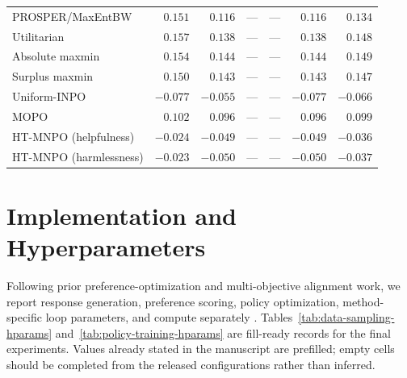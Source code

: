\documentclass{article}
\theoremstyle{remark}
\theoremstyle{plain}
\begin{document}
\begin{table}[t]
\begin{tabular}{lrrrrrr}
PROSPER/MaxEntBW & $0.151$ & $0.116$ & --- & --- & $0.116$ & $0.134$\\
Utilitarian & $0.157$ & $0.138$ & --- & --- & $0.138$ & $0.148$\\
Absolute maxmin & $0.154$ & $0.144$ & --- & --- & $0.144$ & $0.149$\\
Surplus maxmin & $0.150$ & $0.143$ & --- & --- & $0.143$ & $0.147$\\
Uniform-INPO & $-0.077$ & $-0.055$ & --- & --- & $-0.077$ & $-0.066$\\
MOPO & $0.102$ & $0.096$ & --- & --- & $0.096$ & $0.099$\\
HT-MNPO (helpfulness) & $-0.024$ & $-0.049$ & --- & --- & $-0.049$ & $-0.036$\\
HT-MNPO (harmlessness) & $-0.023$ & $-0.050$ & --- & --- & $-0.050$ & $-0.037$\\
\bottomrule
\end{tabular}
\end{table}

\section{Implementation and Hyperparameters}
\label{app:hyperparameters}
Following prior preference-optimization and multi-objective alignment work, we report response generation, preference scoring, policy optimization, method-specific loop parameters, and compute separately \citep{munos2024nash,zhang2025iterative,zhong2024panacea,zhang2026prosper}. Tables~\ref{tab:data-sampling-hparams} and~\ref{tab:policy-training-hparams} are fill-ready records for the final experiments. Values already stated in the manuscript are prefilled; empty cells should be completed from the released configurations rather than inferred.
\end{document}
